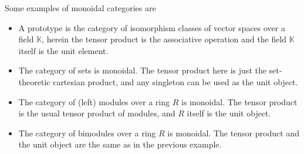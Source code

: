 Some examples of monoidal categories are
\begin{itemize}
\item
A prototype is the category of isomorphism classes of vector spaces over a field $\mathbb{K}$, herein the tensor product is the associative operation and the field $\mathbb{K}$ itself is the unit element.
\item
The category of sets is monoidal.  The tensor product here is just the set-theoretic cartesian product, and any singleton can be used as the unit object.
\item
The category of (left) modules over a ring $R$ is monoidal.  The tensor product is the usual tensor product of modules, and $R$ itself is the unit object.
\item
The category of bimodules over a ring $R$ is monoidal.  The tensor product and the unit object are the same as in the previous example.
\end{itemize}